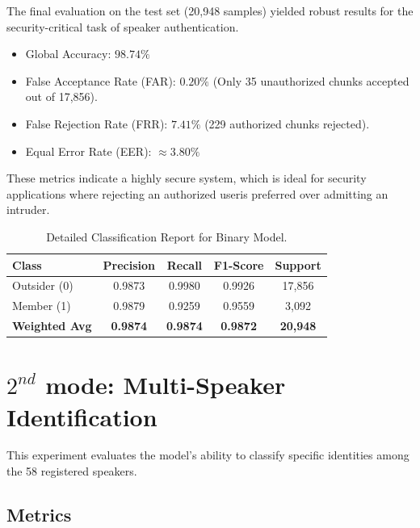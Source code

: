 \documentclass[12pt,a4paper]{article}
\newcommand{\numSpeakers}{58}
\begin{document}
The final evaluation on the test set (20,948 samples) yielded robust results for the security-critical task of speaker authentication.

\begin{itemize}
    \item Global Accuracy: $98.74\%$
    \item False Acceptance Rate (FAR): $0.20\%$ (Only 35 unauthorized chunks accepted out of 17,856).
    \item False Rejection Rate (FRR): $7.41\%$ (229 authorized chunks rejected).
    \item Equal Error Rate (EER): $\approx 3.80\%$
\end{itemize}

These metrics indicate a highly secure system, which is ideal for security applications where rejecting an authorized useris preferred over admitting an intruder.

\begin{table}[h]
\centering
\begin{tabular}{l|c|c|c|c}
\textbf{Class} & \textbf{Precision} & \textbf{Recall} & \textbf{F1-Score} & \textbf{Support} \\ \hline
Outsider (0) & 0.9873 & 0.9980 & 0.9926 & 17,856 \\
Member (1) & 0.9879 & 0.9259 & 0.9559 & 3,092 \\ \hline
\textbf{Weighted Avg} & \textbf{0.9874} & \textbf{0.9874} & \textbf{0.9872} & \textbf{20,948} \\
\end{tabular}
\caption{Detailed Classification Report for Binary Model.}
\label{tab:binary_results}
\end{table}








\section{$2^{nd}$ mode: Multi-Speaker Identification}

This experiment evaluates the model's ability to classify specific identities among the \numSpeakers{} registered speakers.

\subsection{Metrics}
\end{document}
